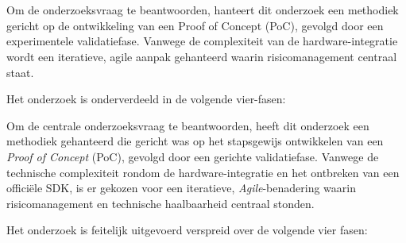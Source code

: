 
\chapter{}%
\label{ch:methodologie}



Om de onderzoeksvraag te beantwoorden, hanteert dit onderzoek een methodiek gericht op de ontwikkeling van een Proof of Concept (PoC), gevolgd door een experimentele validatiefase.
Vanwege de complexiteit van de hardware-integratie wordt een iteratieve, agile aanpak gehanteerd waarin risicomanagement centraal staat. 

Het onderzoek is onderverdeeld in de volgende vier-fasen:



Om de centrale onderzoeksvraag te beantwoorden, heeft dit onderzoek een methodiek gehanteerd die gericht was op het stapsgewijs ontwikkelen van een 
\textit{Proof of Concept} (PoC), gevolgd door een gerichte validatiefase. Vanwege de technische complexiteit rondom de hardware-integratie en het ontbreken van 
een officiële SDK, is er gekozen voor een iteratieve, \textit{Agile}-benadering waarin risicomanagement en technische haalbaarheid centraal stonden.

Het onderzoek is feitelijk uitgevoerd verspreid over de volgende vier fasen:

